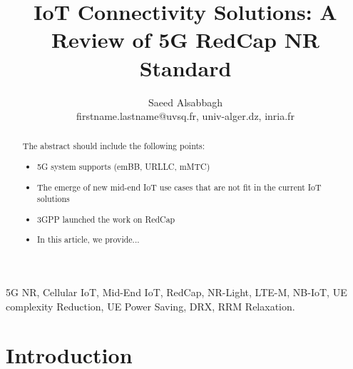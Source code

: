 \documentclass[conference]{IEEEtran}
\begin{document}
\title{IoT Connectivity Solutions: A Review of 5G RedCap NR Standard}


\author{Saeed Alsabbagh 


firstname.lastname@uvsq.fr, univ-alger.dz, 
inria.fr
\vspace{0mm}
}


\maketitle

\begin{abstract}
The abstract should include the following points:
\begin{itemize}
    \item   5G system supports (emBB, URLLC, mMTC)
    \item   The emerge of new mid-end IoT use cases that are not fit in the current IoT solutions
    \item   3GPP launched the work on RedCap
    \item   In this article, we provide...
\end{itemize}


\end{abstract}

\begin{IEEEkeywords}
5G NR, Cellular IoT, Mid-End IoT, RedCap, NR-Light, LTE-M, NB-IoT, UE complexity Reduction, UE Power Saving, DRX, RRM Relaxation.
\end{IEEEkeywords}



\section{Introduction}
\label{sec:1-Inro}
\end{document}
